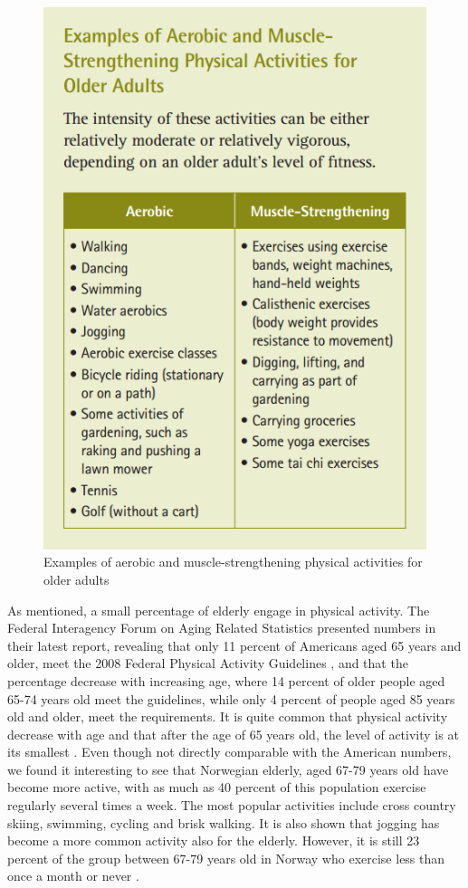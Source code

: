 \begin{figure}
\begin{center}
\includegraphics[scale=0.6]{typeofexercise}
\caption[Examples of aerobic and muscle-strengthening physical activities for 
older adults ]{Examples of aerobic and muscle-strengthening physical activities for 
older adults \cite{guidelines}}
\label{fig:typeofexercise}
\end{center}
\end{figure} 

As mentioned, a small percentage of elderly engage in physical activity. The Federal Interagency Forum on Aging Related Statistics \cite{olderamericans} presented numbers in their latest report, revealing that only 11 percent of Americans aged 65 years and older, meet the 2008 Federal Physical Activity Guidelines \cite{guidelines}, and that the percentage decrease with increasing age, where 14 percent of older people aged 65-74 years old meet the guidelines, while only 4 percent of people aged 85 years old and older, meet the requirements.  It is quite common that physical activity decrease with age and that after the age of 65 years old, the level of activity is at its smallest \cite{schutzer}. Even though not directly comparable with the American numbers, we found it interesting to see that Norwegian elderly, aged  67-79 years old have become more active, with as much as 40 percent of this population exercise regularly several times a week. The most popular activities include cross country skiing, swimming, cycling and brisk walking. It is also shown that jogging has become a more common activity also for the elderly. However, it is still 23 percent of the group between 67-79 years old in Norway who exercise less than once a month or never \cite{statisticsnorway}.

